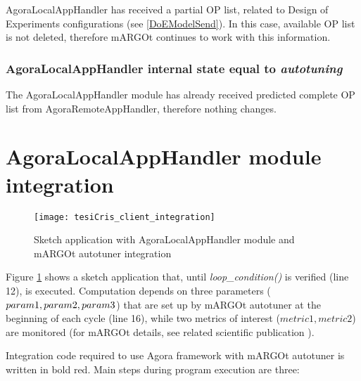 AgoraLocalAppHandler has received a partial OP list, related to Design of Experiments configurations (see \ref{DoEModelSend}). In this case, available OP list is not deleted, therefore mARGOt continues to work with this information.


\subsubsection{AgoraLocalAppHandler internal state equal to \textit{autotuning}}

The AgoraLocalAppHandler module has already received predicted complete OP list from AgoraRemoteAppHandler, therefore nothing changes.





\section{AgoraLocalAppHandler module integration}

\begin{figure}[htb]

    \centering
    \texttt{[image: tesiCris\_client\_integration]}

    \caption{Sketch application with AgoraLocalAppHandler module and mARGOt autotuner integration}

    \label{fig::sketchApp}
    
\end{figure}

Figure \ref{fig::sketchApp} shows a sketch application that, until \textit{loop\_con\-di\-tion()} is verified (line 12), is executed. Computation depends on three parameters ($pa\-ram1, pa\-ram2, pa\-ram3$) that are set up by mARGOt autotuner at the beginning of each cycle (line 16), while two metrics of interest ($metric1, metric2$) are monitored (for mARGOt details, see related scientific publication \cite{gadioli2015application}).

Integration code required to use Agora framework with mARGOt autotuner is written in bold red. Main steps during program execution are three:

